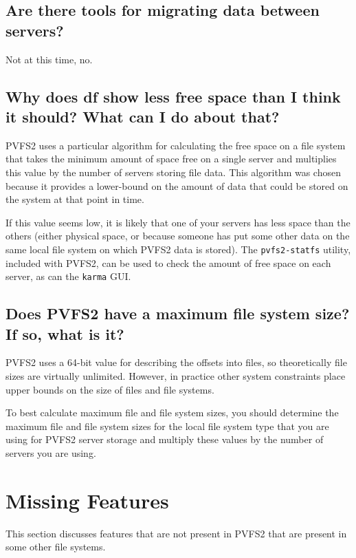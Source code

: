 \documentclass[11pt,letterpaper]{article}
\begin{document}
\subsection{Are there tools for migrating data between servers?}
\label{sec:migration}

Not at this time, no.

\subsection{Why does df show less free space than I think it should? What
            can I do about that?}

PVFS2 uses a particular algorithm for calculating the free space on a file
system that takes the minimum amount of space free on a single server and
multiplies this value by the number of servers storing file data.
%
This algorithm was chosen because it provides a lower-bound on the amount of
data that could be stored on the system at that point in time.

If this value seems low, it is likely that one of your servers has less space
than the others (either physical space, or because someone has put some other
data on the same local file system on which PVFS2 data is stored).  The
\texttt{pvfs2-statfs} utility, included with PVFS2, can be used to check the
amount of free space on each server, as can the \texttt{karma} GUI.

\subsection{Does PVFS2 have a maximum file system size? If so, what is it?}

PVFS2 uses a 64-bit value for describing the offsets into files, so
theoretically file sizes are virtually unlimited.  However, in practice other
system constraints place upper bounds on the size of files and file systems.

To best calculate maximum file and file system sizes, you should determine the
maximum file and file system sizes for the local file system type that you are
using for PVFS2 server storage and multiply these values by the number of
servers you are using.

%
%
\section{Missing Features}

This section discusses features that are not present in PVFS2 that are present
in some other file systems.
\end{document}
